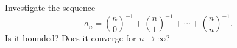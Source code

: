 Investigate the sequence
\[ a_n = \binom{n}{0}^{-1} + \binom{n}{1}^{-1} + \cdots + \binom{n}{n}^{-1}. \]
Is it bounded? Does it converge for $n \to \infty$?
